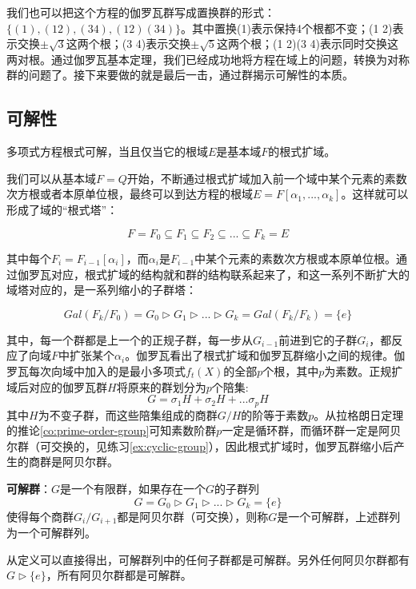 \documentclass[b5paper]{ctexart}
\begin{document}
我们也可以把这个方程的伽罗瓦群写成置换群的形式：$\{(1), (1 2), (3 4), (1 2)(3 4)\}$。其中置换(1)表示保持4个根都不变；(1 2)表示交换$\pm \sqrt{3}$这两个根；(3 4)表示交换$\pm \sqrt{5}$这两个根；(1 2)(3 4)表示同时交换这两对根。通过伽罗瓦基本定理，我们已经成功地将方程在域上的问题，转换为对称群的问题了。接下来要做的就是最后一击，通过群揭示可解性的本质。

\subsection{可解性}

\begin{definition}
多项式方程根式可解，当且仅当它的根域$E$是基本域$F$的根式扩域。
\end{definition}

我们可以从基本域$F = Q$开始，不断通过根式扩域加入前一个域中某个元素的素数次方根或者本原单位根，最终可以到达方程的根域$E = F[\alpha_1, ..., \alpha_k]$。这样就可以形成了域的“根式塔”：

\[
F = F_0 \subseteq F_1 \subseteq F_2 \subseteq ... \subseteq F_k = E
\]

其中每个$F_i = F_{i-1}[\alpha_i]$，而$\alpha_i$是$F_{i-1}$中某个元素的素数次方根或本原单位根。通过伽罗瓦对应，根式扩域的结构就和群的结构联系起来了，和这一系列不断扩大的域塔对应的，是一系列缩小的子群塔：

\[
Gal(F_k/F_0) = G_0 \rhd G_1 \rhd ... \rhd G_k = Gal(F_k/F_k) = \{e\}
\]

其中，每一个群都是上一个的正规子群，每一步从$G_{i-1}$前进到它的子群$G_i$，都反应了向域$F$中扩张某个$\alpha_i$。伽罗瓦看出了根式扩域和伽罗瓦群缩小之间的规律。伽罗瓦每次向域中加入的是最小多项式$f_t(X)$的全部$p$个根，其中$p$为素数。正规扩域后对应的伽罗瓦群$H$将原来的群划分为$p$个陪集:
\[
G = \sigma_1H + \sigma_2H + ... \sigma_pH
\]
其中$H$为不变子群，而这些陪集组成的商群$G/H$的阶等于素数$p$。从拉格朗日定理的推论\ref{co:prime-order-group}可知素数阶群$p$一定是循环群，而循环群一定是阿贝尔群（可交换的，见练习\ref{ex:cyclic-group}），因此根式扩域时，伽罗瓦群缩小后产生的商群是阿贝尔群。

\begin{definition}
\textbf{可解群}：$G$是一个有限群，如果存在一个$G$的子群列
\[
  G = G_0 \rhd G_1 \rhd ... \rhd G_k = \{e\}
\]
使得每个商群$G_i/G_{i+1}$都是阿贝尔群（可交换），则称$G$是一个可解群，上述群列为一个可解群列。
\end{definition}

从定义可以直接得出，可解群列中的任何子群都是可解群。另外任何阿贝尔群都有$G \rhd \{e\}$，所有阿贝尔群都是可解群。
\end{document}

